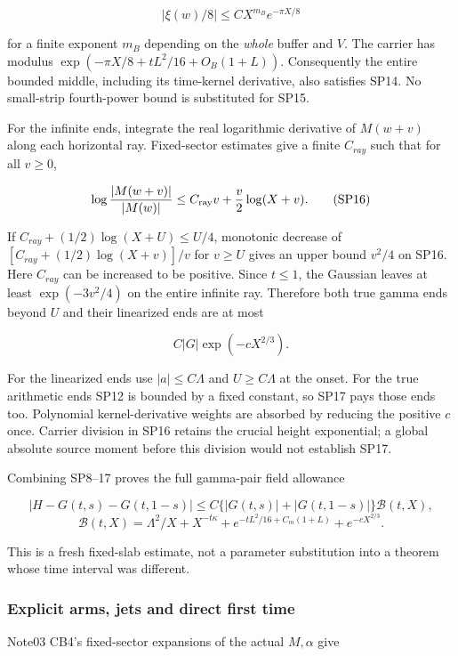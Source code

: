 \[
|\xi(w)/8|\le C X^{m_B}e^{-\pi X/8}
\tag{SP15}\label{eq:ansatz-sp15}
\]

for a finite exponent \(m_{B}\) depending on the \emph{whole} buffer and \(V\). The carrier has modulus \(\exp(-\pi X/8+tL^{2}/16+O_{B}(1+L))\). Consequently the entire bounded middle, including its time-kernel derivative, also satisfies SP14. No small-strip fourth-power bound is substituted for SP15.

For the infinite ends, integrate the real logarithmic derivative of \(M(w+v)\) along each horizontal ray. Fixed-sector estimates give a finite \(C_{ray}\) such that for all \(v\ge 0\),

\[
\log\frac{|M(w+v)|}{|M(w)|}
 \le C_{\rm ray}v+\frac v2\log(X+v).
\tag{SP16}\label{eq:ansatz-sp16}
\]

If \(C_{ray}+(1/2)\log(X+U)\le U/4\), monotonic decrease of \([C_{ray}+(1/2)\log(X+v)]/v\) for \(v\ge U\) gives an upper bound \(v^{2}/4\) on SP16. Here \(C_{ray}\) can be increased to be positive. Since \(t\le 1\), the Gaussian leaves at least \(\exp(-3v^{2}/4)\) on the entire infinite ray. Therefore both true gamma ends beyond \(U\) and their linearized ends are at most

\[
C |G|\exp(-c X^{2/3}).
\tag{SP17}\label{eq:ansatz-sp17}
\]

For the linearized ends use \(|a|\le C \Lambda\) and \(U\ge C \Lambda\) at the onset. For the true arithmetic ends SP12 is bounded by a fixed constant, so SP17 pays those ends too. Polynomial kernel-derivative weights are absorbed by reducing the positive \(c\) once. Carrier division in SP16 retains the crucial height exponential; a global absolute source moment before this division would not establish SP17.

Combining SP8--17 proves the full gamma-pair field allowance

\[
\left|H-G(t,s)-G(t,1-s)\right|
 \le C\{ |G(t,s)|+|G(t,1-s)|\}\mathcal B(t,X),
\]
\[
\mathcal B(t,X)=\Lambda^2/X+X^{-t\kappa}
 +e^{-tL^2/16+C_m(1+L)}+e^{-cX^{2/3}}.
\tag{SP18}\label{eq:ansatz-sp18}
\]

This is a fresh fixed-slab estimate, not a parameter substitution into a theorem whose time interval was different.

\subsubsection{Explicit arms, jets and direct first time}
\label{subsec:sp-5}

Note03 CB4's fixed-sector expansions of the actual \(M,\alpha\) give

